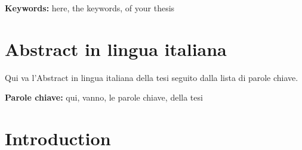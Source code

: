 \documentclass{Configuration_Files/PoliMi3i_thesis}
\begin{document}
\textbf{Keywords:} here, the keywords, of your thesis %

\chapter*{Abstract in lingua italiana}
Qui va l'Abstract in lingua italiana della tesi seguito dalla lista di parole chiave.

\textbf{Parole chiave:} qui, vanno, le parole chiave, della tesi %


\thispagestyle{empty}
\tableofcontents %
\thispagestyle{empty}
\cleardoublepage

%
%
%    
%

\mainmatter %

\chapter*{Introduction}
\end{document}

